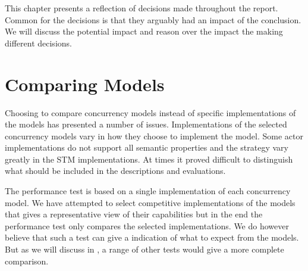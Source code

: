 \makeatletter {}\makeatother
{}
This chapter presents a reflection of decisions made throughout the report. Common for the decisions is that they arguably had an impact of the conclusion. We will discuss the potential impact and reason over the impact the making different decisions.

\section{Comparing Models}
Choosing to compare concurrency models instead of specific implementations of the models has presented a number of issues. Implementations of the selected concurrency models vary in how they choose to implement the model. Some actor implementations do not support all semantic properties and the strategy vary greatly in the \ac{STM} implementations. At times it proved difficult to distinguish what should be included in the descriptions and evaluations. 

The performance test is based on a single implementation of each concurrency model. We have attempted to select competitive implementations of the models that gives a representative view of their capabilities but in the end the performance test only compares the selected implementations. We do however believe that such a test can give a indication of what to expect from the models. But as we will discuss in , a range of other tests would give a more complete comparison.

